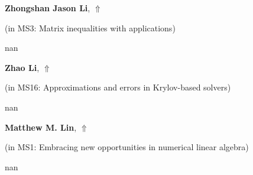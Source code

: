 \documentclass[ILAS2025-program.tex]{subfiles}
\begin{document}
     \hypertarget{down0267}{}\begin{ilasabstract}
    
    \textbf{Zhongshan Jason Li},  \hfill \hyperlink{up0267}{$\Uparrow$}
    
    (in {\color{mstitle}MS3: Matrix inequalities with applications})
        
        \mtskip
    nan\end{ilasabstract}
     \hypertarget{down0346}{}\begin{ilasabstract}
    
    \textbf{Zhao Li},  \hfill \hyperlink{up0346}{$\Uparrow$}
    
    (in {\color{mstitle}MS16: Approximations and errors in Krylov-based solvers})
        
        \mtskip
    nan\end{ilasabstract}
     \hypertarget{down0071}{}\begin{ilasabstract}
    
    \textbf{Matthew M. Lin},  \hfill \hyperlink{up0071}{$\Uparrow$}
    
    (in {\color{mstitle}MS1: Embracing new opportunities in numerical linear algebra})
        
        \mtskip
    nan\end{ilasabstract}
\end{document}
